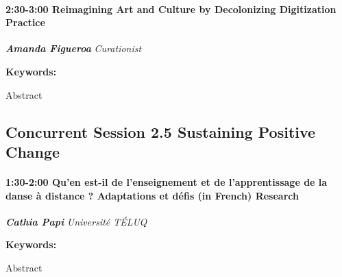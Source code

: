 \documentclass[
]{book}
\begin{document}
\begin{session}
\hypertarget{reimagining-art-and-culture-by-decolonizing-digitization-practice}{%
\paragraph*{\texorpdfstring{2:30-3:00 \textbar{} \textbf{Reimagining Art
and Culture by Decolonizing Digitization} \textbar{}
Practice}{2:30-3:00 \textbar{} Reimagining Art and Culture by Decolonizing Digitization \textbar{} Practice}}\label{reimagining-art-and-culture-by-decolonizing-digitization-practice}}

\textbf{\emph{Amanda Figueroa}} \textbar{} \emph{Curationist}

\textbf{Keywords:}

Abstract
\end{session}

\hypertarget{concurrent-session-2.5-sustaining-positive-change}{%
\subsection*{Concurrent Session 2.5 \textbar{} Sustaining Positive Change}\label{concurrent-session-2.5-sustaining-positive-change}}

\begin{session}
\hypertarget{quen-est-il-de-lenseignement-et-de-lapprentissage-de-la-danse-uxe0-distance-adaptations-et-duxe9fis-in-french-research}{%
\paragraph*{\texorpdfstring{1:30-2:00 \textbar{} \textbf{Qu'en est-il de
l'enseignement et de l'apprentissage de la danse à distance ?
Adaptations et défis (in French)} \textbar{}
Research}{1:30-2:00 \textbar{} Qu'en est-il de l'enseignement et de l'apprentissage de la danse à distance ? Adaptations et défis (in French) \textbar{} Research}}\label{quen-est-il-de-lenseignement-et-de-lapprentissage-de-la-danse-uxe0-distance-adaptations-et-duxe9fis-in-french-research}}

\textbf{\emph{Cathia Papi}} \textbar{} \emph{Université TÉLUQ}

\textbf{Keywords:}

Abstract
\end{session}
\end{document}
